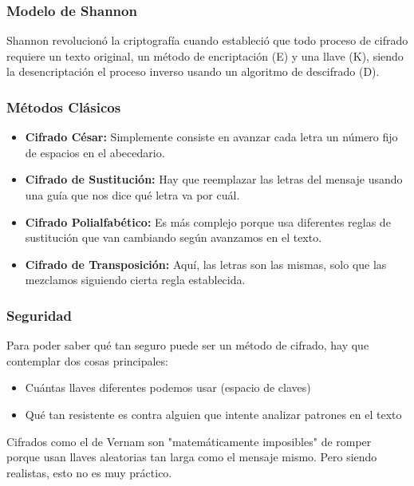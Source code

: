 \documentclass{article}
\begin{document}
        \subsubsection{Modelo de Shannon}
            Shannon revolucionó la criptografía cuando estableció que todo proceso de cifrado requiere un texto original, un método de 
        encriptación (E) y una llave (K), siendo la desencriptación el proceso inverso usando un algoritmo de descifrado (D).

        \subsubsection{Métodos Clásicos}
            \begin{itemize}
                \item \textbf{Cifrado César:} Simplemente consiste en avanzar cada letra un número fijo de espacios en el abecedario.
                \item \textbf{Cifrado de Sustitución:} Hay que reemplazar las letras del mensaje usando una guía que nos dice qué letra va por cuál.
                \item \textbf{Cifrado Polialfabético:} Es más complejo porque usa diferentes reglas de sustitución que van cambiando según avanzamos en el texto.
                \item \textbf{Cifrado de Transposición:} Aquí, las letras son las mismas, solo que las mezclamos siguiendo cierta regla establecida.
            \end{itemize}
        
        \subsubsection{Seguridad}
            Para poder saber qué tan seguro puede ser un método de cifrado, hay que contemplar dos cosas principales:
            \begin{itemize}
                \item Cuántas llaves diferentes podemos usar (espacio de claves)
                \item Qué tan resistente es contra alguien que intente analizar patrones en el texto
            \end{itemize}
            Cifrados como el de Vernam son "matemáticamente imposibles" de romper porque usan llaves
            aleatorias tan larga como el mensaje mismo. Pero siendo realistas, esto no es muy práctico.
        
\end{document}
